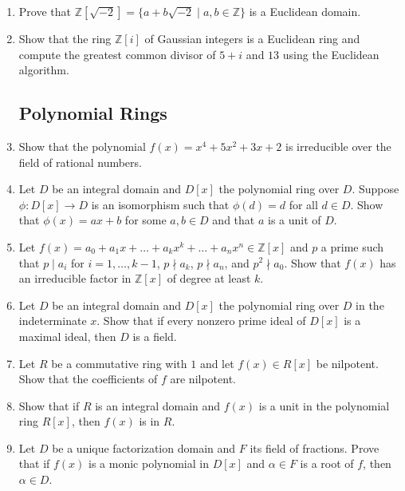 \documentclass{article}
\theoremstyle{definition}
\newcommand{\Z}{\mathbb{Z}}
\begin{document}
\begin{enumerate}
            \item Prove that $\Z[\sqrt{-2}]=\{a+b\sqrt{-2} \mid a,b \in \Z\}$ is a Euclidean domain.
            
            \item Show that the ring $\Z[i]$ of Gaussian integers is a Euclidean ring and compute the greatest common divisor of $5+i$ and $13$ using the Euclidean algorithm.

        \subsection{Polynomial Rings}

            \item Show that the polynomial $f(x)=x^4+5x^2+3x+2$ is irreducible over the field of rational numbers.
            
            \item Let $D$ be an integral domain and $D[x]$ the polynomial ring over $D$. Suppose $\phi : D[x] \to D$ is an isomorphism such that $\phi(d)=d$ for all $d\in D$. Show that $\phi(x)=ax+b$ for some $a,b\in D$ and that $a$ is a unit of $D$.
            
            \item Let $f(x)=a_0+a_1x+\hdots +a_kx^k+\hdots +a_nx^n \in \Z[x]$ and $p$ a prime such that $p\mid a_i$ for $i=1,\hdots,k-1$, $p\nmid a_k$, $p\nmid a_n$, and $p^2\nmid a_0$. Show that $f(x)$ has an irreducible factor in $\Z[x]$ of degree at least $k$.
            
            \item Let $D$ be an integral domain and $D[x]$ the polynomial ring over $D$ in the indeterminate $x$. Show that if every nonzero prime ideal of $D[x]$ is a maximal ideal, then $D$ is a field.
            
            \item Let $R$ be a commutative ring with $1$ and let $f(x)\in R[x]$ be nilpotent. Show that the coefficients of $f$ are nilpotent.
            
            \item Show that if $R$ is an integral domain and $f(x)$ is a unit in the polynomial ring $R[x]$, then $f(x)$ is in $R$.
            
            \item Let $D$ be a unique factorization domain and $F$ its field of fractions. Prove that if $f(x)$ is a monic polynomial in $D[x]$ and $\alpha \in F$ is a root of $f$, then $\alpha \in D$.
            

\end{enumerate}
\end{document}
